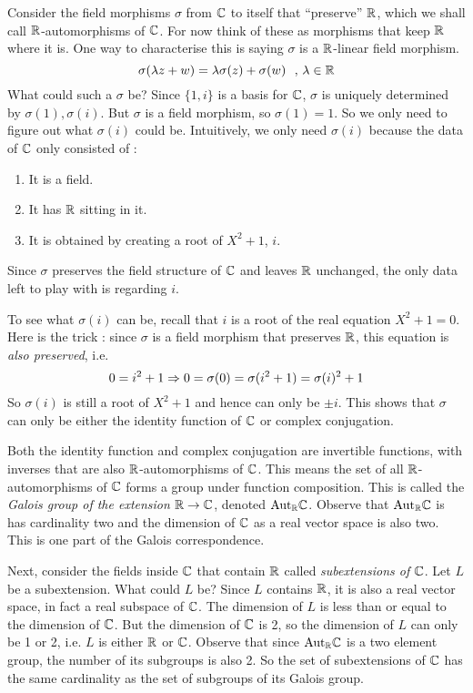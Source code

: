 \documentclass[../book.tex]{subfiles}
\begin{document}
Consider the field morphisms $\sigma$ from $\mathbb{C}$ to itself that ``preserve'' $\mathbb{R}$,
which we shall call $\mathbb{R}$-automorphisms of $\mathbb{C}$.
For now think of these as morphisms that keep $\mathbb{R}$ where it is. 
One way to characterise this is saying $\sigma$ is a $\mathbb{R}$-linear field morphism.\[
    \sigma(\lambda z + w) = \lambda \sigma(z) + \sigma(w) \,\,\,\,,\, \lambda \in \mathbb{R}
\]
What could such a $\sigma$ be? 
Since $\{1,i\}$ is a basis for $\mathbb{C}$, 
$\sigma$ is uniquely determined by $\sigma(1), \sigma(i)$.
But $\sigma$ is a field morphism, so $\sigma(1) = 1$. 
So we only need to figure out what $\sigma(i)$ could be. 
Intuitively, we only need $\sigma(i)$ because 
the data of $\mathbb{C}$ only consisted of : \begin{enumerate}
    \item It is a field.
    \item It has $\mathbb{R}$ sitting in it.
    \item It is obtained by creating a root of $X^2 + 1$, $i$.
\end{enumerate}
Since $\sigma$ preserves the field structure of $\mathbb{C}$ and leaves $\mathbb{R}$ unchanged,
the only data left to play with is regarding $i$. 

To see what $\sigma(i)$ can be, recall that 
$i$ is a root of the real equation $X^2 + 1 = 0$.
Here is the trick : 
since $\sigma$ is a field morphism that preserves $\mathbb{R}$, 
this equation is \emph{also preserved},
i.e. \[
    0 = i^2 + 1 \Rightarrow 
    0 = \sigma(0) = \sigma(i^2 + 1) = \sigma(i)^2 + 1
\]
So $\sigma(i)$ is still a root of $X^2 + 1$
and hence can only be $\pm i$. 
This shows that $\sigma$ can only be either the identity function of $\mathbb{C}$
or complex conjugation. 

Both the identity function and complex conjugation are invertible functions,
with inverses that are also $\mathbb{R}$-automorphisms of $\mathbb{C}$. 
This means the set of all $\mathbb{R}$-automorphisms of $\mathbb{C}$ forms a group
under function composition. 
This is called the \emph{Galois group of the extension $\mathbb{R} \to \mathbb{C}$},
denoted $\mathrm{Aut}_{\mathbb{R}}\mathbb{C}$.
Observe that $\mathrm{Aut}_{\mathbb{R}}\mathbb{C}$ is has cardinality two
and the dimension of $\mathbb{C}$ as a real vector space is also two.
This is one part of the Galois correspondence.

Next, consider the fields inside $\mathbb{C}$ that contain $\mathbb{R}$ called 
\emph{subextensions of $\mathbb{C}$}.
Let $L$ be a subextension. What could $L$ be?
Since $L$ contains $\mathbb{R}$, it is also a real vector space,
in fact a real subspace of $\mathbb{C}$. 
The dimension of $L$ is less than or equal to the dimension of $\mathbb{C}$. 
But the dimension of $\mathbb{C}$ is 2, so the dimension of $L$ can only be 1 or 2,
i.e. $L$ is either $\mathbb{R}$ or $\mathbb{C}$.
Observe that since $\mathrm{Aut}_{\mathbb{R}}\mathbb{C}$ is a two element group, 
the number of its subgroups is also 2. 
So the set of subextensions of $\mathbb{C}$ has the same cardinality as 
the set of subgroups of its Galois group.
\end{document}
